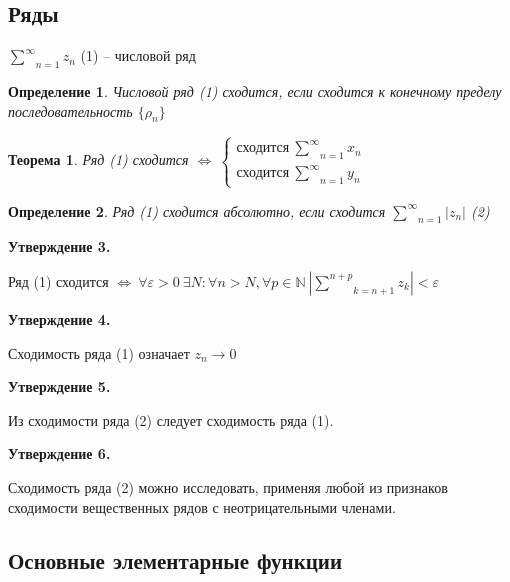 \documentclass[draft]{article}
\newcommand{\N}{\mathbb{N}}
\newcommand{\ind}[3]{\underset{#1}{\overset{#2}{#3}}}
\newcommand{\LRA}{\Leftrightarrow}
\newcommand{\e}{\varepsilon}
\newcommand{\rd}{\underset{n=1}{\overset{\infty}{\sum}}}
\newcommand{\sys}[1]{\left\{\begin{matrix}#1\end{matrix}\right.}
\newcommand{\opr}[1]{\begin{opred}#1\end{opred}}
\newtheorem*{theor}{Теорема}
\newtheorem*{opred}{Определение}
\theoremstyle{remark}
\begin{document}
\subsection{Ряды}

$\ind{n=1}{\infty}{\sum}z_n$ (1) -- числовой ряд

\opr{Числовой ряд (1) сходится, если сходится к конечному пределу последовательность $\{\rho_n\}$}

\begin{theor}
Ряд (1) сходится $\LRA\ \sys{\mbox{сходится}\ \ind{n=1}{\infty}{\sum}x_n \\ \mbox{сходится}\ \ind{n=1}{\infty}{\sum}y_n }$
\end{theor}

\opr{Ряд (1) сходится абсолютно, если сходится $\rd |z_n|$ (2)}

{\bfseries Утверждение 3.}

Ряд (1) сходится $\LRA\ \forall\e>0\ \exists N\colon\forall n>N,\forall p\in\N\ \left|\ind{k=n+1}{n+p}{\sum}z_k\right|<\e$

{\bfseries Утверждение 4.}

Сходимость ряда (1) означает $z_n\to 0$

{\bfseries Утверждение 5.}

Из сходимости ряда (2) следует сходимость ряда (1).

{\bfseries Утверждение 6.}

Сходимость ряда (2) можно исследовать, применяя любой из признаков сходимости вещественных рядов с неотрицательными членами.

\newpage

\subsection{Основные элементарные функции}
\end{document}
